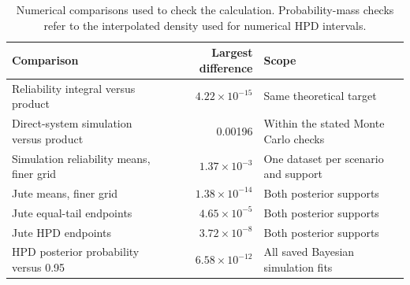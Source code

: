 \begin{table}[htbp]
\centering
\caption{Numerical comparisons used to check the calculation. Probability-mass checks refer to the interpolated density used for numerical HPD intervals.}\label{tab:numerical-checks}
\small
\begin{tabular}{p{.43\linewidth}rp{.30\linewidth}}
\toprule
Comparison & Largest difference & Scope \\
\midrule
Reliability integral versus product & $4.22\times10^{-15}$ & Same theoretical target \\
Direct-system simulation versus product & 0.00196 & Within the stated Monte Carlo checks \\
Simulation reliability means, finer grid & $1.37\times10^{-3}$ & One dataset per scenario and support \\
Jute means, finer grid & $1.38\times10^{-14}$ & Both posterior supports \\
Jute equal-tail endpoints & $4.65\times10^{-5}$ & Both posterior supports \\
Jute HPD endpoints & $3.72\times10^{-8}$ & Both posterior supports \\
HPD posterior probability versus 0.95 & $6.58\times10^{-12}$ & All saved Bayesian simulation fits \\
\bottomrule
\end{tabular}
\end{table}
